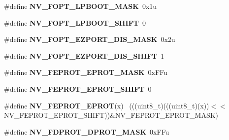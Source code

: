 \begin{DoxyCompactItemize}
\item 
\hypertarget{group___n_v___register___masks_gabe7cb388b4a9f41cc264e7df5ecdf883}{}\#define {\bfseries N\+V\+\_\+\+F\+O\+P\+T\+\_\+\+L\+P\+B\+O\+O\+T\+\_\+\+M\+A\+S\+K}~0x1u\label{group___n_v___register___masks_gabe7cb388b4a9f41cc264e7df5ecdf883}

\item 
\hypertarget{group___n_v___register___masks_ga2fc27fe10cf14eb30613e131fe7e758e}{}\#define {\bfseries N\+V\+\_\+\+F\+O\+P\+T\+\_\+\+L\+P\+B\+O\+O\+T\+\_\+\+S\+H\+I\+F\+T}~0\label{group___n_v___register___masks_ga2fc27fe10cf14eb30613e131fe7e758e}

\item 
\hypertarget{group___n_v___register___masks_ga5c130a6f11de9f04a77b36fd61843e8f}{}\#define {\bfseries N\+V\+\_\+\+F\+O\+P\+T\+\_\+\+E\+Z\+P\+O\+R\+T\+\_\+\+D\+I\+S\+\_\+\+M\+A\+S\+K}~0x2u\label{group___n_v___register___masks_ga5c130a6f11de9f04a77b36fd61843e8f}

\item 
\hypertarget{group___n_v___register___masks_gabf1111ccacc4104b2855c4f3851cbaa5}{}\#define {\bfseries N\+V\+\_\+\+F\+O\+P\+T\+\_\+\+E\+Z\+P\+O\+R\+T\+\_\+\+D\+I\+S\+\_\+\+S\+H\+I\+F\+T}~1\label{group___n_v___register___masks_gabf1111ccacc4104b2855c4f3851cbaa5}

\item 
\hypertarget{group___n_v___register___masks_gae309f9fbc7ce46321fbe34e89077fd7a}{}\#define {\bfseries N\+V\+\_\+\+F\+E\+P\+R\+O\+T\+\_\+\+E\+P\+R\+O\+T\+\_\+\+M\+A\+S\+K}~0x\+F\+Fu\label{group___n_v___register___masks_gae309f9fbc7ce46321fbe34e89077fd7a}

\item 
\hypertarget{group___n_v___register___masks_gad725c7b093dfd814cfae3e3fe8522ed2}{}\#define {\bfseries N\+V\+\_\+\+F\+E\+P\+R\+O\+T\+\_\+\+E\+P\+R\+O\+T\+\_\+\+S\+H\+I\+F\+T}~0\label{group___n_v___register___masks_gad725c7b093dfd814cfae3e3fe8522ed2}

\item 
\hypertarget{group___n_v___register___masks_gabcc836b96405f4caaf42e866658a0ff6}{}\#define {\bfseries N\+V\+\_\+\+F\+E\+P\+R\+O\+T\+\_\+\+E\+P\+R\+O\+T}(x)                                          ~(((uint8\+\_\+t)(((uint8\+\_\+t)(x))$<$$<$N\+V\+\_\+\+F\+E\+P\+R\+O\+T\+\_\+\+E\+P\+R\+O\+T\+\_\+\+S\+H\+I\+F\+T))\&N\+V\+\_\+\+F\+E\+P\+R\+O\+T\+\_\+\+E\+P\+R\+O\+T\+\_\+\+M\+A\+S\+K)\label{group___n_v___register___masks_gabcc836b96405f4caaf42e866658a0ff6}

\item 
\hypertarget{group___n_v___register___masks_ga004ff32c4f18a922a47aaf9adea14d41}{}\#define {\bfseries N\+V\+\_\+\+F\+D\+P\+R\+O\+T\+\_\+\+D\+P\+R\+O\+T\+\_\+\+M\+A\+S\+K}~0x\+F\+Fu\label{group___n_v___register___masks_ga004ff32c4f18a922a47aaf9adea14d41}


\end{DoxyCompactItemize}
